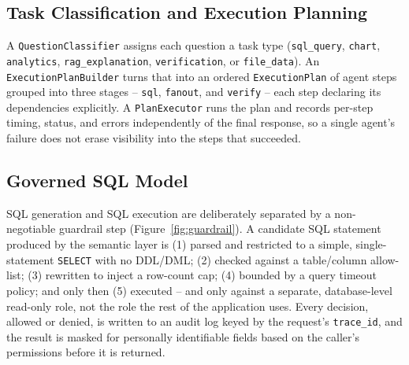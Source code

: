 \documentclass[conference]{IEEEtran}
\begin{document}
\subsection{Task Classification and Execution Planning}

A \texttt{QuestionClassifier} assigns each question a task type
(\texttt{sql\_query}, \texttt{chart}, \texttt{analytics},
\texttt{rag\_explanation}, \texttt{verification}, or \texttt{file\_data}).
An \texttt{ExecutionPlanBuilder} turns that into an ordered
\texttt{ExecutionPlan} of agent steps grouped into three stages --
\texttt{sql}, \texttt{fanout}, and \texttt{verify} -- each step declaring
its dependencies explicitly. A \texttt{PlanExecutor} runs the plan and
records per-step timing, status, and errors independently of the final
response, so a single agent's failure does not erase visibility into the
steps that succeeded.

\subsection{Governed SQL Model}

SQL generation and SQL execution are deliberately separated by a
non-negotiable guardrail step (Figure~\ref{fig:guardrail}). A candidate SQL
statement produced by the semantic layer is (1) parsed and restricted to a
simple, single-statement \texttt{SELECT} with no DDL/DML; (2) checked
against a table/column allow-list; (3) rewritten to inject a row-count
cap; (4) bounded by a query timeout policy; and only then (5) executed --
and only against a separate, database-level read-only role, not the role
the rest of the application uses. Every decision, allowed or denied, is
written to an audit log keyed by the request's \texttt{trace\_id}, and the
result is masked for personally identifiable fields based on the caller's
permissions before it is returned.
\end{document}
